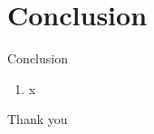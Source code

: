 \documentclass[14pt,hyperref={CJKbookmarks=true}]{beamer}
\theoremstyle{plain}
\theoremstyle{definition}
\theoremstyle{remark}
\begin{document}
\section{Conclusion}
\begin{frame}{Conclusion}
\small
\begin{enumerate}
\item  x
\end{enumerate}
\end{frame}
\begin{frame}
\Huge
\begin{center}
Thank you
\end{center}


\end{frame}
\end{document}
